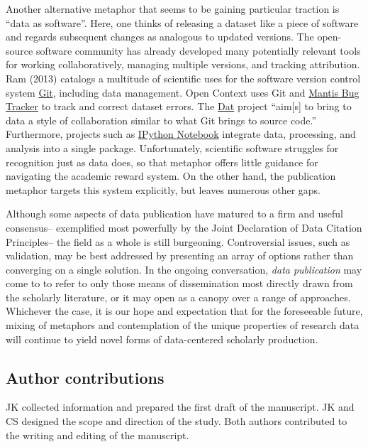 \documentclass[10pt,a4paper,twocolumn]{article}
\begin{document}
{{Another alternative metaphor that seems to be gaining particular traction is ``data as software''\cite{schopf_treating_2012}.
Here, one thinks of releasing a dataset like a piece of software and regards subsequent changes as analogous to updated versions.
The open-source software community has already developed many potentially relevant tools for working collaboratively, managing multiple versions, and tracking attribution.
Ram (2013)\cite{ram_git_2013} catalogs a multitude of scientific uses for the software version control system \href{http://git-scm.com/}{Git}, including data management.
Open Context uses Git and \href{http://www.mantisbt.org/}{Mantis Bug Tracker} to track and correct dataset errors.
The \href{http://dat-data.com/}{Dat} project ``aim[s] to bring to data a style of collaboration similar to what Git brings to source code.''
Furthermore, projects such as \href{http://ipython.org/notebook}{IPython Notebook} integrate data, processing, and analysis into a single package.
Unfortunately, scientific software struggles for recognition\cite{pradal_publishing_2013} just as data does, so that metaphor offers little guidance for navigating the academic reward system.
On the other hand, the publication metaphor targets this system explicitly, but leaves numerous other gaps.

Although some aspects of data publication have matured to a firm and useful consensus-- exemplified most powerfully by the Joint Declaration of Data Citation Principles-- the field as a whole is still burgeoning.
Controversial issues, such as validation, may be best addressed by presenting an array of options rather than converging on a single solution.
In the ongoing conversation, \emph{data publication} may come to to refer to only those means of dissemination most directly drawn from the scholarly literature, or it may open as a canopy over a range of approaches.
Whichever the case, it is our hope and expectation that for the foreseeable future, mixing of metaphors and contemplation of the unique properties of research data will continue to yield novel forms of data-centered scholarly production.


\subsection*{Author contributions}
JK collected information and prepared the first draft of the manuscript.
JK and CS designed the scope and direction of the study.
Both authors contributed to the writing and editing of the manuscript.

}}
\end{document}
